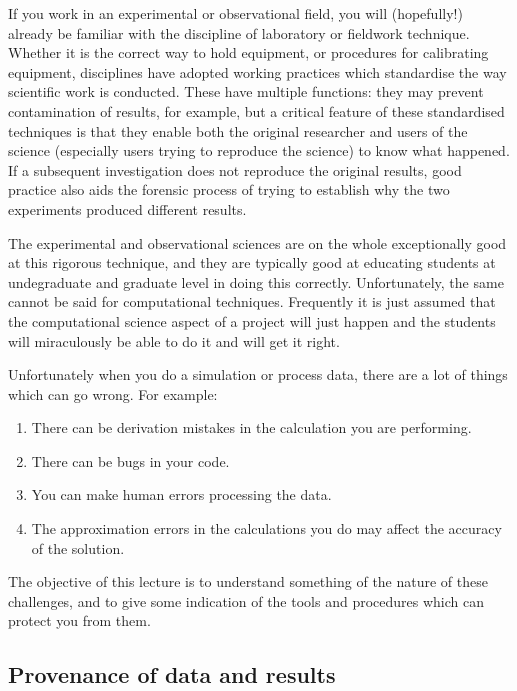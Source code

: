 \documentclass[a4paper,12pt]{article}
\theoremstyle{definition}
\begin{document}
If you work in an experimental or observational field, you will (hopefully!)
already be familiar with the discipline of laboratory or fieldwork
technique. Whether it is the correct way to hold equipment, or procedures
for calibrating equipment, disciplines have adopted working practices which
standardise the way scientific work is conducted. These have multiple
functions: they may prevent contamination of results, for example, but a
critical feature of these standardised techniques is that they enable both
the original researcher and users of the science (especially users trying to
reproduce the science) to know what happened. If a subsequent investigation
does not reproduce the original results, good practice also aids the
forensic process of trying to establish why the two experiments produced
different results.

The experimental and observational sciences are on the whole exceptionally
good at this rigorous technique, and they are typically good at educating
students at undegraduate and graduate level in doing this
correctly. Unfortunately, the same cannot be said for computational
techniques. Frequently it is just assumed that the computational science
aspect of a project will just happen and the students will miraculously be
able to do it and will get it right.

Unfortunately when you do a simulation or process data, there are a lot of
things which can go wrong. For example:
\begin{enumerate}
\item There can be derivation mistakes in the calculation you are performing.
\item There can be bugs in your code.
\item You can make human errors processing the data.
\item The approximation errors in the calculations you do may affect the
  accuracy of the solution.
\end{enumerate}
The objective of this lecture is to understand something of the nature of
these challenges, and to give some indication of the tools and procedures
which can protect you from them.

\subsection{Provenance of data and results}
\end{document}
